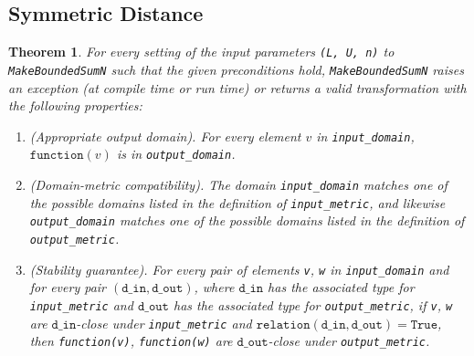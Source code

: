 \documentclass[11pt,a4paper]{article}
\newtheorem{theorem}{Theorem}[section]
\theoremstyle{definition}
\newcommand{\din}{\texttt{d\_in}}
\newcommand{\dout}{\texttt{d\_out}}
\newcommand{\True}{\texttt{True}}
\newcommand{\function}{\texttt{function}}
\begin{document}
\subsection{Symmetric Distance}
\begin{theorem}
\label{thrm:privacy-proof}
    For every setting of the input parameters \texttt{(L, U, n)} to \texttt{MakeBoundedSumN} such that the given preconditions hold, \texttt{MakeBoundedSumN} raises an exception (at compile time or run time) or returns a valid transformation with the following properties:
    \begin{enumerate}
        \item \textup{(Appropriate output domain).} For every element $v$ in \texttt{input\_domain}, $\function(v)$ is in \texttt{output\_domain}.
        
        \item \textup{(Domain-metric compatibility).} The domain \texttt{input\_domain} matches one of the possible domains listed in the definition of \texttt{input\_metric}, and likewise \texttt{output\_domain} matches one of the possible domains listed in the definition of \texttt{output\_metric}.
        
        \item \textup{(Stability guarantee).} For every pair of elements \texttt{v}, \texttt{w} in \texttt{input\_domain} and for every pair $(\din, \dout)$,  where $\din$ has the associated type for \texttt{input\_metric} and $\dout$ has the associated type for \texttt{output\_metric}, if \texttt{v}, \texttt{w} are $\din$-close under \texttt{input\_metric} and $\texttt{relation}(\din, \dout) = \True$, then \texttt{function(v)}, \texttt{function(w)} are $\dout$-close under \texttt{output\_metric}.
    \end{enumerate}
\end{theorem}
\end{document}
